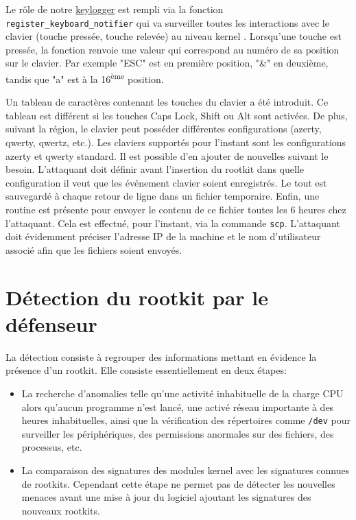 \documentclass[12pt]{article}
\begin{document}
        Le rôle de notre \href{https://github.com/QuokkaLight/rkduck/blob/keylogger/rkduck/keylogger.c}{keylogger} est rempli via la fonction \texttt{register\_keyboard\_notifier} qui va surveiller toutes les interactions avec le clavier (touche pressée, touche relevée) au niveau kernel \cite{keylogger}. Lorsqu'une touche est pressée, la fonction renvoie une valeur qui correspond au numéro de sa position sur le clavier. Par exemple "ESC" est en première position, "\&" en deuxième, tandis que "a" est à la 16\textsuperscript{ème} position.
        
        Un tableau de caractères contenant les touches du clavier a été introduit. Ce tableau est différent si les touches Caps Lock, Shift ou Alt sont activées. De plus, suivant la région, le clavier peut posséder différentes configurations (azerty, qwerty, qwertz, etc.). Les claviers supportés pour l'instant sont les configurations azerty et qwerty standard. Il est possible d'en ajouter de nouvelles suivant le besoin. L'attaquant doit définir avant l'insertion du rootkit dans quelle configuration il veut que les événement clavier soient enregistrés. Le tout est sauvegardé à chaque retour de ligne dans un fichier temporaire.         
        Enfin, une routine est présente pour envoyer le contenu de ce fichier toutes les 6 heures chez l'attaquant. Cela est effectué, pour l'instant, via la commande \texttt{scp}. L'attaquant doit évidemment préciser l'adresse IP de la machine et le nom d'utilisateur associé afin que les fichiers soient envoyés.
                
\section{Détection du rootkit par le défenseur}
    
    La détection consiste à regrouper des informations mettant en évidence la présence d'un rootkit. Elle consiste essentiellement en deux étapes\cite{detection}:
    \begin{itemize}
    	\item La recherche d'anomalies telle qu'une activité inhabituelle de la charge CPU alors qu'aucun programme n'est lancé, une activé réseau importante à des heures inhabituelles, ainsi que la vérification des répertoires comme \texttt{/dev} pour surveiller les périphériques, des permissions anormales sur des fichiers, des processus, etc.
    	\item La comparaison des signatures des modules kernel avec les signatures connues de rootkits. Cependant cette étape ne permet pas de détecter les nouvelles menaces avant une mise à jour du logiciel ajoutant les signatures des nouveaux rootkits.
    \end{itemize}
    
\end{document}
